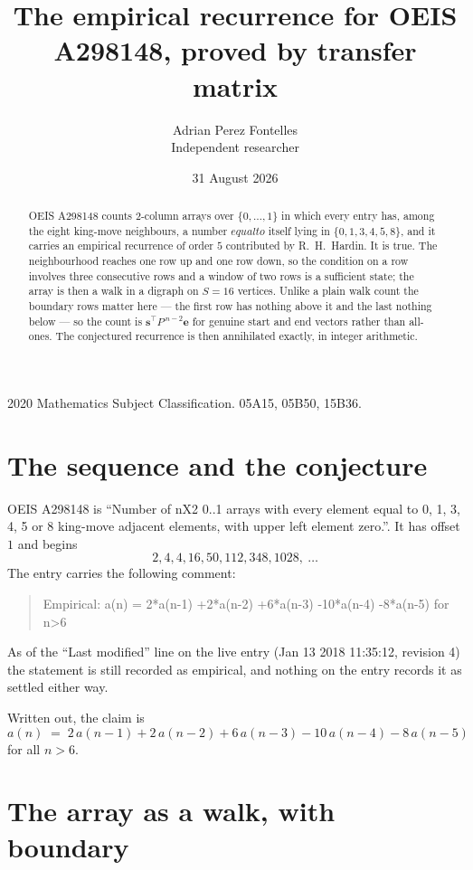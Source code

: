 \documentclass[11pt,a4paper]{article}
\title{The empirical recurrence for OEIS A298148, proved by transfer matrix}
\author{Adrian Perez Fontelles\\ \small Independent researcher}
\date{31 August 2026}
\theoremstyle{plain}
\theoremstyle{definition}
\begin{document}
\maketitle

\begin{abstract}
OEIS A298148 counts $2$-column arrays over $\{0,\dots,1\}$ in which every entry has,
among the eight king-move neighbours, a number $equal to$ itself lying in $\{0,1,3,4,5,8\}$, and it carries an empirical
recurrence of order $5$ contributed by R.~H.~Hardin. It is true. The neighbourhood
reaches one row up and one row down, so the condition on a row involves three consecutive
rows and a window of two rows is a sufficient state; the array is then a walk in a digraph
on $S=16$ vertices. Unlike a plain walk count the boundary rows matter here --- the first
row has nothing above it and the last nothing below --- so the count is
$\mathbf{s}^{\!\top}P^{\,n-2}\mathbf{e}$ for genuine start and end vectors rather than
all-ones. The conjectured recurrence is then annihilated exactly, in integer arithmetic.
\end{abstract}

\noindent\small 2020 Mathematics Subject Classification. 05A15, 05B50, 15B36.\normalsize

\section{The sequence and the conjecture}

OEIS A298148 is ``Number of nX2 0..1 arrays with every element equal to 0, 1, 3, 4, 5 or 8 king-move adjacent elements, with upper left element zero.''. It has offset
$1$ and begins
\[
2, 4, 4, 16, 50, 112, 348, 1028,\ \dots
\]
The entry carries the following comment:
\begin{quote}\small
Empirical: a(n) = 2*a(n-1) +2*a(n-2) +6*a(n-3) -10*a(n-4) -8*a(n-5) for n>6
\end{quote}
As of the ``Last modified'' line on the live entry (Jan 13 2018 11:35:12, revision
4) the statement is still recorded as empirical, and nothing on the entry
records it as settled either way.

Written out, the claim is
\begin{equation}\label{eq:conj}
a(n)\;=\;2\,a(n-1) + 2\,a(n-2) + 6\,a(n-3) - 10\,a(n-4) - 8\,a(n-5)
\end{equation}
for all $n>6$.

\section{The array as a walk, with boundary}
\end{document}

